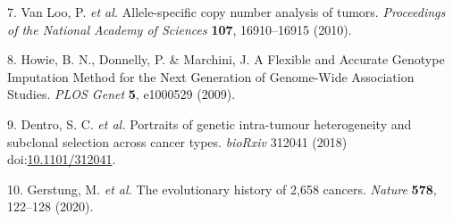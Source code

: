 \documentclass[]{article}
\begin{document}
\leavevmode\hypertarget{ref-van_loo_allele-specific_2010}{}%
7. Van Loo, P. \emph{et al.} Allele-specific copy number analysis of
tumors. \emph{Proceedings of the National Academy of Sciences}
\textbf{107}, 16910--16915 (2010).

\leavevmode\hypertarget{ref-howie_flexible_2009}{}%
8. Howie, B. N., Donnelly, P. \& Marchini, J. A Flexible and Accurate
Genotype Imputation Method for the Next Generation of Genome-Wide
Association Studies. \emph{PLOS Genet} \textbf{5}, e1000529 (2009).

\leavevmode\hypertarget{ref-dentro_portraits_2018}{}%
9. Dentro, S. C. \emph{et al.} Portraits of genetic intra-tumour
heterogeneity and subclonal selection across cancer types.
\emph{bioRxiv} 312041 (2018)
doi:\href{https://doi.org/10.1101/312041}{10.1101/312041}.

\leavevmode\hypertarget{ref-gerstung_evolutionary_2020}{}%
10. Gerstung, M. \emph{et al.} The evolutionary history of 2,658
cancers. \emph{Nature} \textbf{578}, 122--128 (2020).
\end{document}
